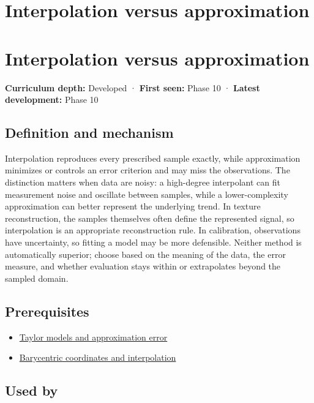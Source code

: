 \hypertarget{appendix-0c2a5f69851e}{}
\section*{Interpolation versus approximation}
\section{Interpolation versus approximation}\label{interpolation-versus-approximation}

\textbf{Curriculum depth:} Developed · \textbf{First seen:} Phase 10 · \textbf{Latest development:} Phase 10

\subsection{Definition and mechanism}\label{definition-and-mechanism}

Interpolation reproduces every prescribed sample exactly, while approximation minimizes or controls an error criterion and may miss the observations. The distinction matters when data are noisy: a high-degree interpolant can fit measurement noise and oscillate between samples, while a lower-complexity approximation can better represent the underlying trend. In texture reconstruction, the samples themselves often define the represented signal, so interpolation is an appropriate reconstruction rule. In calibration, observations have uncertainty, so fitting a model may be more defensible. Neither method is automatically superior; choose based on the meaning of the data, the error measure, and whether evaluation stays within or extrapolates beyond the sampled domain.

\subsection{Prerequisites}\label{prerequisites}

\begin{itemize}
\tightlist
\item
  \hyperref[appendix-32f39e9a3738]{Taylor models and approximation error}
\item
  \hyperref[appendix-02b9d9a81dca]{Barycentric coordinates and interpolation}
\end{itemize}

\subsection{Used by}\label{used-by}

